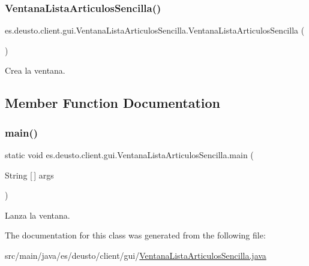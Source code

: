 \subsubsection{\texorpdfstring{VentanaListaArticulosSencilla()}{VentanaListaArticulosSencilla()}}
{\footnotesize\ttfamily es.\+deusto.\+client.\+gui.\+Ventana\+Lista\+Articulos\+Sencilla.\+Ventana\+Lista\+Articulos\+Sencilla (\begin{DoxyParamCaption}{ }\end{DoxyParamCaption})}

Crea la ventana. 

\subsection{Member Function Documentation}
\mbox{\label{classes_1_1deusto_1_1client_1_1gui_1_1_ventana_lista_articulos_sencilla_a23845d0a41b2598ae3d319bc7337d08d}} 
\subsubsection{\texorpdfstring{main()}{main()}}
{\footnotesize\ttfamily static void es.\+deusto.\+client.\+gui.\+Ventana\+Lista\+Articulos\+Sencilla.\+main (\begin{DoxyParamCaption}\item[{String \mbox{[}$\,$\mbox{]}}]{args }\end{DoxyParamCaption})\hspace{0.3cm}{\ttfamily [static]}}

Lanza la ventana. 

The documentation for this class was generated from the following file\+:\begin{DoxyCompactItemize}
\item 
src/main/java/es/deusto/client/gui/\mbox{\hyperlink{_ventana_lista_articulos_sencilla_8java}{Ventana\+Lista\+Articulos\+Sencilla.\+java}}\end{DoxyCompactItemize}
